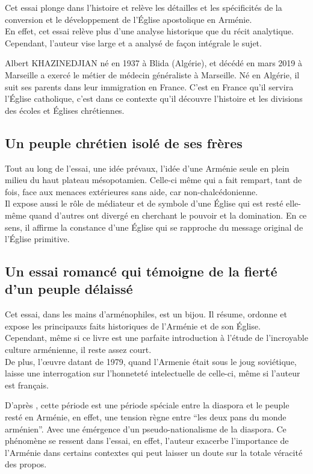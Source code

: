 \documentclass[11pt, a4paper]{report}
\begin{document}
    Cet essai plonge dans l'histoire et relève les détailles et les spécificités de la conversion et le développement de l'Église apostolique en Arménie.\\
    En effet, cet essai relève plus d'une analyse historique que du récit analytique.
    Cependant, l'auteur vise large et a analysé de façon intégrale le sujet.
    \bigbreak

    Albert KHAZINEDJIAN né en 1937 à Blida (Algérie), et décédé en mars 2019 à Marseille a exercé le métier de médecin généraliste à Marseille.
    Né en Algérie, il suit ses parents dans leur immigration en France. 
    C'est en France qu'il servira l'Église catholique, c'est dans ce contexte qu'il découvre l'histoire et les divisions des écoles et Églises chrétiennes.

    \subsection*{Un peuple chrétien isolé de ses frères}

    Tout au long de l'essai, une idée prévaux, l'idée d'une Arménie seule en plein milieu du haut plateau mésopotamien. 
    Celle-ci même qui a fait rempart, tant de fois, face aux menaces extérieures sans aide, car non-chalcédonienne.\\
    Il expose aussi le rôle de médiateur et de symbole d'une Église qui est resté elle-même quand d'autres ont divergé en cherchant le pouvoir
    et la domination. En ce sens, il affirme la constance d'une Église qui se rapproche du message original de l'Église primitive.

    \subsection*{Un essai romancé qui témoigne de la fierté d'un peuple délaissé}

    Cet essai, dans les mains d'arménophiles, est un bijou.
    Il résume, ordonne et expose les principauxs faits historiques de l'Arménie et de son Église.\\
    Cependant, même si ce livre est une parfaite introduction à l'étude de l'incroyable culture arménienne, il reste assez court.\\
    De plus, l'œuvre datant de 1979, quand l'Armenie était sous le joug soviétique, 
    laisse une interrogation sur l'honneteté intelectuelle de celle-ci, même si l'auteur est français.
    
    D'après , cette période est une période spéciale entre la diaspora et le peuple resté en Arménie,
    en effet, une tension règne entre \enquote{les deux pans du monde arménien}\cite{livre:geopol}.
    Avec une émérgence d'un pseudo-nationalisme de la diaspora. Ce phénomène se ressent dans l'essai,
    en effet, l'auteur exacerbe l'importance de l'Arménie dans certains contextes qui peut laisser un doute sur la totale véracité des propos.
    \bigbreak
\end{document}
